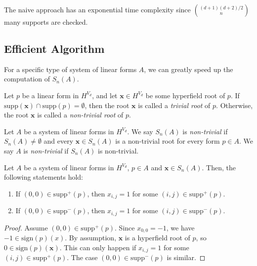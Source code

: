 The naive approach has an exponential time complexity since $\binom{(d+1)(d + 2)/2}{n}$ many supports are checked.

\subsection*{Efficient Algorithm}

For a specific type of system of linear forms $A$, we can greatly speed up the computation of $S_{n}(A)$.


\begin{definition}
    Let $p$ be a linear form in \( H^{V_d} \), and let $\mathbf{x} \in {H}^{V_d}$ be some hyperfield root of $p$. If $\mathrm{supp}(\mathbf{x}) \cap \mathrm{supp}(p) = \emptyset$, then the root $\mathbf{x}$ is called a \emph{trivial root} of $p$. Otherwise, the root $\mathbf{x}$ is called a \emph{non-trivial root} of $p$.
\end{definition}

\begin{definition}
    Let $A$ be a system of linear forms in \( H^{V_d} \). We say $S_{n}(A)$ is \emph{non-trivial} if $S_{n}(A) \neq \emptyset$ and every $\mathbf{x} \in S_{n}(A)$ is a non-trivial root for every form $p \in A$. We say $A$ is \emph{non-trivial} if $S_{n}(A)$ is non-trivial.
\end{definition}
  
\begin{proposition}
Let $A$ be a system of linear forms in \( H^{V_d} \), $p \in A$ and $\mathbf{x} \in S_{n}(A)$. Then, the following statements hold:
\begin{enumerate}
    \item If $(0,0) \in \mathrm{supp}^+(p)$, then $x_{i,j} = 1$ for some $(i,j) \in \mathrm{supp}^+(p)$. 
    \item If $(0,0) \in \mathrm{supp}^-(p)$, then $x_{i,j} = 1$ for some $(i,j) \in \mathrm{supp}^-(p)$. 
\end{enumerate}
\end{proposition}


\begin{proof}
Assume $(0,0) \in \mathrm{supp}^+(p)$. Since $x_{0,0} = -1$, we have $-1 \in \mathrm{sign}(p)(x)$. By assumption, $\mathbf{x}$ is a hyperfield root of $p$, so $0 \in \mathrm{sign}(p)(\mathbf{x})$. This can only happen if $x_{i,j} = 1$ for some $(i,j) \in \mathrm{supp}^+(p)$. The case $(0,0) \in \mathrm{supp}^-(p)$ is similar.
\end{proof}

